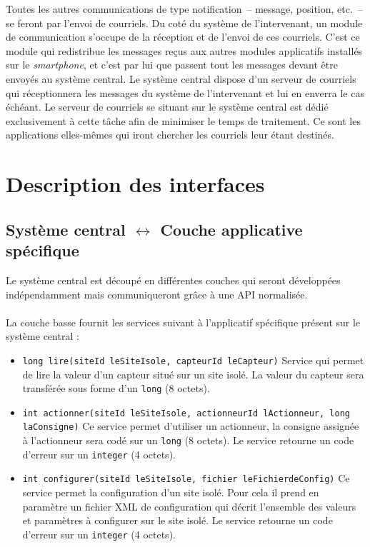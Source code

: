 \documentclass[a4paper, 11pt, final]{article}
\begin{document}
Toutes les autres communications de type notification~-- message, position, etc.~-- se feront par l'envoi de courriels. Du coté du système de l'intervenant, un module de communication s'occupe de la réception et de l'envoi de ces courriels. C'est ce module qui redistribue les messages reçus aux autres modules applicatifs installés sur le \textit{smartphone}, et c'est par lui que passent tout les messages devant être envoyés au système central. Le système central dispose d'un serveur de courriels qui réceptionnera les messages du système de l'intervenant et lui en enverra le cas échéant. Le serveur de courriels se situant sur le système central est dédié exclusivement à cette tâche afin de minimiser le temps de traitement. Ce sont les applications elles-mêmes qui iront chercher les courriels leur étant destinés.

\section{Description des interfaces}

\subsection{Système central $\leftrightarrow$ Couche applicative spécifique}
Le système central est découpé en différentes couches qui seront
développées indépendamment mais communiqueront grâce à une API normalisée.

\paragraph{}
La couche basse fournit les services suivant à l'applicatif spécifique présent sur le système central :
\begin{itemize}
\item \texttt{long lire(siteId leSiteIsole, capteurId leCapteur)}
Service qui permet de lire la valeur d'un capteur situé sur un site isolé.
La valeur du capteur sera transférée sous forme d'un \texttt{long} (8 octets).
\item \texttt{int actionner(siteId leSiteIsole, actionneurId lActionneur, long laConsigne)}
Ce service permet d'utiliser un actionneur, la consigne assignée à l'actionneur
sera codé sur un \texttt{long} (8 octets). Le service retourne un code d'erreur sur un
\texttt{integer} (4 octets).
\item \texttt{int configurer(siteId leSiteIsole, fichier leFichierdeConfig)}
Ce service permet la configuration d'un site isolé. Pour cela il prend en
paramètre un fichier XML de configuration qui décrit l'ensemble des valeurs
et paramètres à configurer sur le site isolé. Le service retourne un code
d'erreur sur un \texttt{integer} (4 octets).
\end{itemize}
\end{document}
